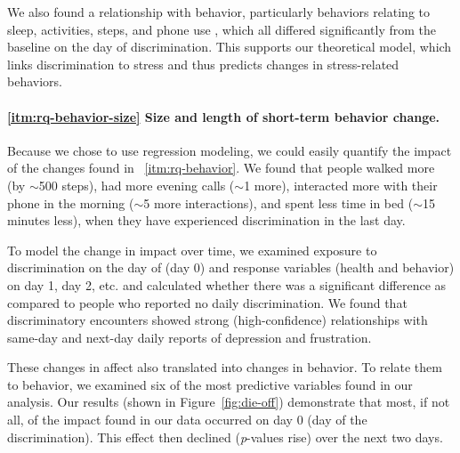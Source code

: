 We also found a relationship with behavior, particularly behaviors relating to sleep, activities, steps, and phone use , which all differed significantly from the baseline on the day of discrimination. This supports our theoretical model, which links discrimination to stress and thus predicts changes in stress-related behaviors. 

\paragraph{\ref{itm:rq-behavior-size} Size and length of short-term behavior change.}

Because we chose to use regression modeling, we could easily quantify the impact of the changes found in ~\ref{itm:rq-behavior}. We found that people walked more (by $\sim$500 steps), had more evening calls ($\sim$1 more), interacted more with their phone in the morning ($\sim$5 more interactions), and spent less time in bed ($\sim$15 minutes less), when they have experienced discrimination in the last day. 

To model the change in impact over time, we examined exposure to discrimination on the day of (day 0) and response variables (health and behavior) on day 1, day 2, etc. and calculated whether there was a significant difference as compared to people who reported no daily discrimination.  We found that discriminatory encounters showed strong (high-confidence) relationships with same-day and next-day daily reports of depression and frustration. 

These changes in affect also translated into changes in behavior. To relate them to behavior, we examined six of the most predictive variables found in our analysis. Our results (shown in Figure~\ref{fig:die-off}) demonstrate that most, if not all, of the impact found in our data occurred on  day 0 (day of the discrimination). This effect then declined (\textit{p}-values rise) over the next two days. 

